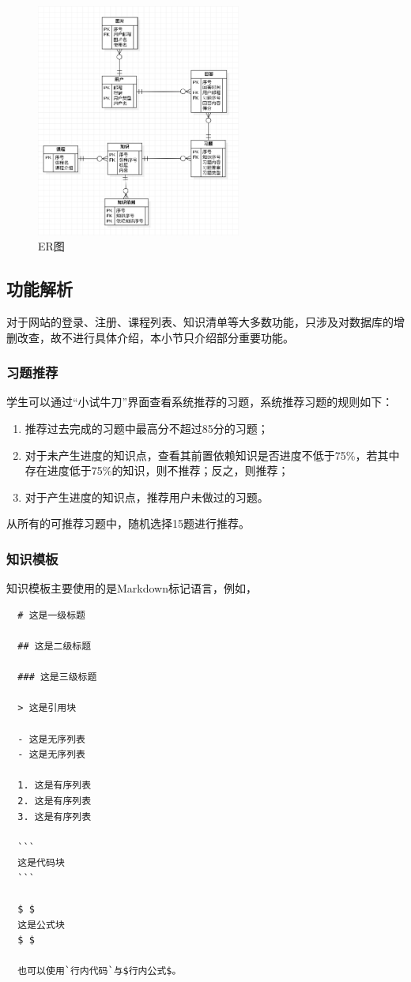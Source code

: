 \documentclass{nwafucoursepaper}
\begin{document}
\begin{figure}[htp]
  \centering
  \includegraphics[width=0.6\textwidth]{ERD.png}
  \caption{ER图}
  \label{ERD}
\end{figure}

\subsection{功能解析}

对于网站的登录、注册、课程列表、知识清单等大多数功能，只涉及对数据库的增删改查，故不进行具体介绍，本小节只介绍部分重要功能。

\subsubsection{习题推荐}

学生可以通过“小试牛刀”界面查看系统推荐的习题，系统推荐习题的规则如下：
\begin{enumerate}
  \item 推荐过去完成的习题中最高分不超过85分的习题；
  \item 对于未产生进度的知识点，查看其前置依赖知识是否进度不低于75\%，若其中存在进度低于75\%的知识，则不推荐；反之，则推荐；
  \item 对于产生进度的知识点，推荐用户未做过的习题。
\end{enumerate}
从所有的可推荐习题中，随机选择15题进行推荐。

\subsubsection{知识模板}

知识模板主要使用的是Markdown标记语言，例如，
\begin{lstlisting}
  # 这是一级标题

  ## 这是二级标题

  ### 这是三级标题

  > 这是引用块

  - 这是无序列表
  - 这是无序列表

  1. 这是有序列表
  2. 这是有序列表
  3. 这是有序列表

  ```
  这是代码块
  ```

  $ $
  这是公式块
  $ $

  也可以使用`行内代码`与$行内公式$。
\end{lstlisting}
\end{document}
